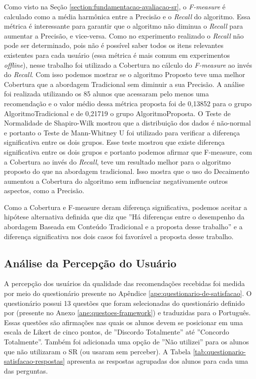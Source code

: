 Como visto na Seção \ref{section:fundamentacao-avaliacao-sr}, o \textit{F-measure} é calculado como a média harmônica entre
a Precisão e o \textit{Recall} do algoritmo. Essa métrica é interessante para garantir que o algoritmo não diminua o \textit{Recall}
para aumentar a Precisão, e vice-versa. Como no experimento realizado o \textit{Recall} não pode ser determinado, pois não
é possível saber todos os itens relevantes existentes para cada usuário (essa métrica é mais comum em experimentos
\textit{offline}), nesse trabalho foi utilizado a Cobertura no cálculo do \textit{F-measure} ao invés do \textit{Recall}.
Com isso podemos mostrar se o algoritmo Proposto teve uma melhor Cobertura que a abordagem Tradicional sem diminuir
a sua Precisão. A análise foi realizada utilizando os 85 alunos que acessaram pelo menos uma recomendação e o valor médio
dessa métrica proposta foi de 0,13852 para o grupo AlgoritmoTradicional e de 0,21719 o grupo AlgoritmoProposta.
O Teste de Normalidade de Shapiro-Wilk mostrou que a distribuição dos dados é não-normal e portanto o Teste de
Mann-Whitney U foi utilizado para verificar a diferença significativa entre os dois grupos. Esse teste mostrou que
existe diferença significativa entre os dois grupos e portanto podemos afirmar que F-measure, com a Cobertura ao invés
do \textit{Recall}, teve um resultado melhor para o algoritmo proposto do que na abordagem tradicional. Isso mostra
que o uso do Decaimento aumentou a Cobertura do algoritmo sem influenciar negativamente outros aspectos, como a Precisão.

Como a Cobertura e F-measure deram diferença significativa, podemos aceitar a hipótese alternativa definida
que diz que ''Há diferenças entre o desempenho da abordagem Baseada em Conteúdo Tradicional e a proposta desse trabalho''
e a diferença significativa nos dois casos foi favorável a proposta desse trabalho.

\subsection{Análise da Percepção do Usuário}\label{subsection:analise-questionario-satisfacao}

A percepção dos usuários da qualidade das recomendações recebidas foi medida por meio do questionário presente no
Apêndice \ref{ape:questionario-de-satisfacao}. O questionário possui 13 questões que foram selecionadas do questionário
definido por  (presente no Anexo \ref{ane:questoes-framework}) e traduzidas para o Português.
Essas questões são afirmações nas quais os alunos devem se posicionar em uma escala de
Likert de cinco pontos, de ''Discordo Totalmente'' até ''Concordo Totalmente''. Também foi adicionada uma opção de ''Não utilizei'' para
os alunos que não utilizaram o SR (ou usaram sem perceber). A Tabela \ref{tab:questionario-satisfacao-respostas}
apresenta as respostas agrupadas dos alunos para cada uma das perguntas.

